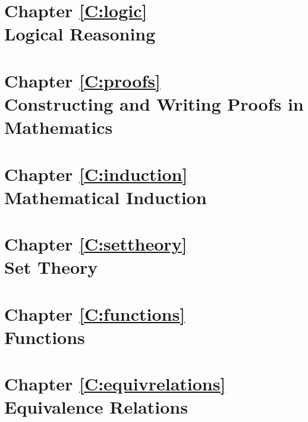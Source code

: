 \documentclass[11pt,openany]{book}
\begin{document}
\chapter*{Chapter \ref{C:logic}\\Logical Reasoning}





\chapter*{Chapter \ref{C:proofs}\\Constructing and Writing Proofs in Mathematics}








\chapter*{Chapter \ref{C:induction}  \\Mathematical Induction}







\chapter*{Chapter \ref{C:settheory}\\Set Theory}








\chapter*{Chapter \ref{C:functions} \\Functions}







\chapter*{Chapter \ref{C:equivrelations} \\Equivalence Relations}




\end{document}
